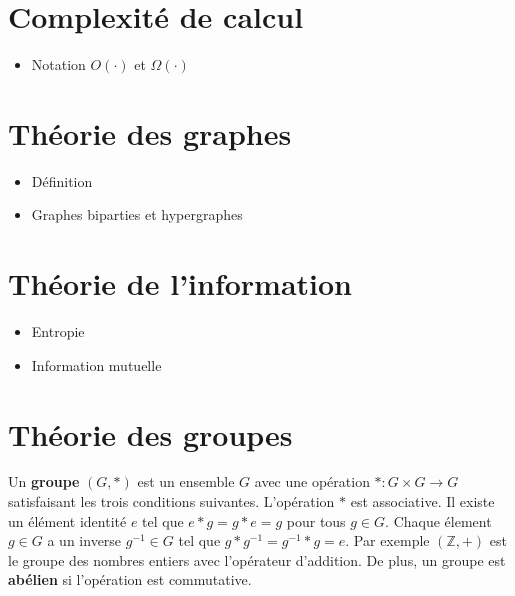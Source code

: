 \begin{comment}
\end{comment}

\appendix

\chapter{Complexité de calcul}
\label{chap:complexite_calcul}

\begin{itemize}
  \item Notation $O(\cdot)$ et $\Omega(\cdot)$
\end{itemize}

\chapter{Théorie des graphes}
\label{chap:theo_graphe}

\begin{itemize}
  \item Définition
  \item Graphes biparties et hypergraphes
\end{itemize}

\chapter{Théorie de l'information}
\label{chap:theo_info}

\begin{itemize}
  \item Entropie
  \item Information mutuelle
\end{itemize}

\chapter{Théorie des groupes}
\label{chap:theo_groupes}

Un \textbf{groupe} $(G, *)$ est un ensemble $G$ avec une opération $* : G \times G \to G$
satisfaisant les trois conditions suivantes.
L'opération $*$ est associative.
Il existe un élément identité $e$ tel que $e * g = g * e = g$ pour tous $g \in G$.
Chaque élement $g \in G$ a un inverse $g^{-1} \in G$ tel que $g * g^{-1} = g^{-1} * g = e$.
Par exemple $(\mathbb Z, +)$ est le groupe des nombres entiers avec l'opérateur d'addition.
De plus, un groupe est \textbf{abélien} si l'opération est commutative.


